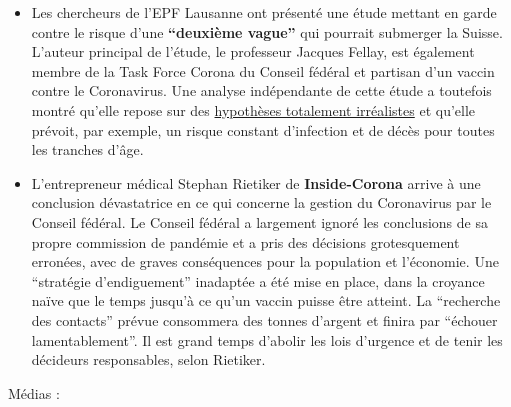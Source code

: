\begin{itemize}
\item
  Les chercheurs de l'EPF Lausanne ont présenté une étude mettant en
  garde contre le risque d'une \textbf{``deuxième vague''} qui pourrait
  submerger la Suisse. L'auteur principal de l'étude, le professeur
  Jacques Fellay, est également membre de la Task Force Corona du
  Conseil fédéral et partisan d'un vaccin contre le Coronavirus. Une
  analyse indépendante de cette étude a toutefois montré qu'elle repose
  sur des
  \href{https://www.heise.de/tp/features/Fellay-Studie-Zweite-Corona-Welle-4726303.html}{hypothèses
  totalement irréalistes} et qu'elle prévoit, par exemple, un risque
  constant d'infection et de décès pour toutes les tranches d'âge.
\item
  L'entrepreneur médical Stephan Rietiker de \textbf{Inside-Corona}
  arrive à une conclusion dévastatrice en ce qui concerne la gestion du
  Coronavirus par le Conseil fédéral. Le Conseil fédéral a largement
  ignoré les conclusions de sa propre commission de pandémie et a pris
  des décisions grotesquement erronées, avec de graves conséquences pour
  la population et l'économie. Une ``stratégie d'endiguement'' inadaptée
  a été mise en place, dans la croyance naïve que le temps jusqu'à ce
  qu'un vaccin puisse être atteint. La ``recherche des contacts'' prévue
  consommera des tonnes d'argent et finira par ``échouer
  lamentablement''. Il est grand temps d'abolir les lois d'urgence et de
  tenir les décideurs responsables, selon Rietiker.
\end{itemize}

Médias :


